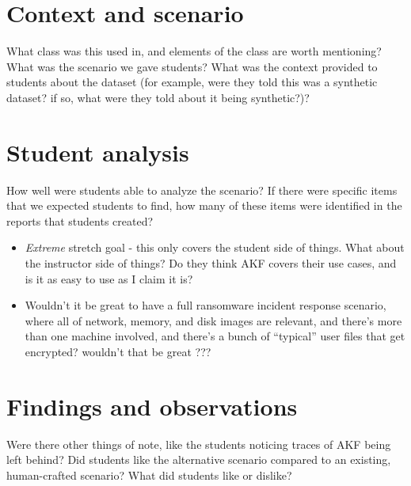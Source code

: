 \section{Context and scenario}\label{context-and-scenario}

What class was this used in, and elements of the class are worth
mentioning? What was the scenario we gave students? What was the context
provided to students about the dataset (for example, were they told this
was a synthetic dataset? if so, what were they told about it being
synthetic?)?

\section{Student analysis}\label{student-analysis}

How well were students able to analyze the scenario? If there were
specific items that we expected students to find, how many of these
items were identified in the reports that students created?

\begin{itemize}
\tightlist
\item
  \emph{Extreme} stretch goal - this only covers the student side of
  things. What about the instructor side of things? Do they think AKF
  covers their use cases, and is it as easy to use as I claim it is?
\item
  Wouldn't it be great to have a full ransomware incident response
  scenario, where all of network, memory, and disk images are relevant,
  and there's more than one machine involved, and there's a bunch of
  ``typical'' user files that get encrypted? wouldn't that be great ???
\end{itemize}

\section{Findings and
observations}\label{findings-and-observations}

Were there other things of note, like the students noticing traces of
AKF being left behind? Did students like the alternative scenario
compared to an existing, human-crafted scenario? What did students like
or dislike?
